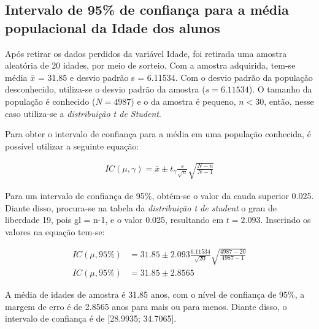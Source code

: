 \subsection{Intervalo de 95\% de confiança para a média populacional da Idade dos alunos}
\label{sub:1a}
	
	Após retirar os dados perdidos da variável Idade, foi retirada uma
	amostra aleatória de 20 idades, por meio de sorteio. Com a amostra
	adquirida, tem-se média $\bar{x}$ = \num{31,85} e desvio padrão s = \num{6,11534}.
	Com o desvio padrão da população desconhecido, utiliza-se o desvio
	padrão da amostra ($s = \num{6,11534}$).  O tamanho da população é conhecido ($N
	= 4987$) e o da amostra é pequeno, $n < 30$, então, nesse caso utiliza-se
	a \textit{distribuição t de Student}.

	Para obter o intervalo de confiança para a média em uma população
	conhecida, é possível utilizar a seguinte equação:

	\begin{align*}
		IC (\mu, \gamma) = \bar{x} \pm t_\gamma \frac{s}{\sqrt{n}} \sqrt{\frac{N-n}{N-1}}
	\end{align*}

	Para um intervalo de confiança de 95\%, obtém-se o valor da cauda
	superior \num{0,025}. Diante disso, procura-se na tabela da \textit{distribuição
	t de student} o grau de liberdade 19, pois gl = n-1, e o valor \num{0,025},
	resultando em $t = \num{2,093}$. Inserindo os valores na equação
	tem-se:

	\begin{align*}
		IC (\mu, 95\%) &= \num{31,85} \pm \num{2,093} \frac{\num{6,11534}}{\sqrt{20}} \sqrt{\frac{4987 - 20}{4987 - 1}} \\
		IC (\mu, 95\%) &= \num{31,85} \pm \num{2,8565}
	\end{align*}

	A média de idades de amostra é \num{31,85} anos, com o nível de confiança de
	95\%, a margem de erro é de \num{2,8565} anos para mais ou para menos. Diante
	disso, o intervalo de confiança é de [\num{28,9935}; \num{34,7065}].

